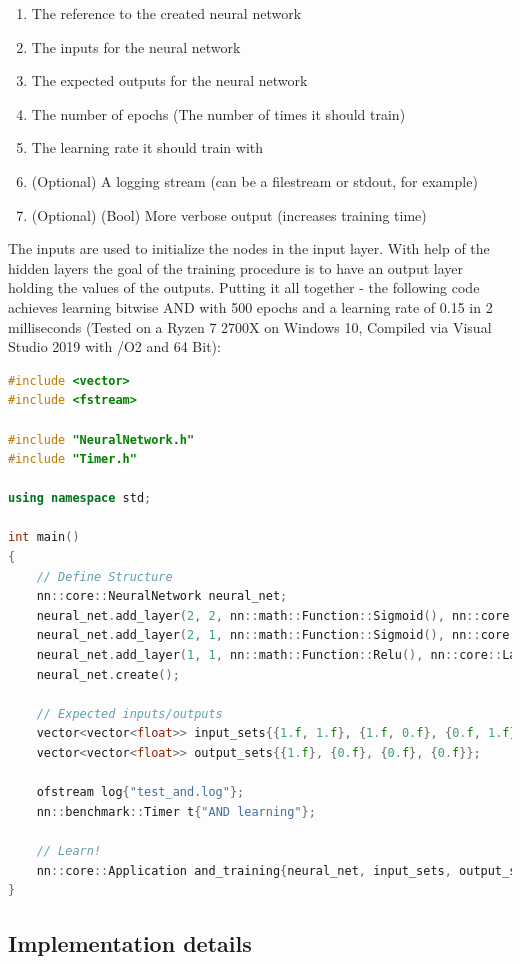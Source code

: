 \begin{enumerate}
	\item The reference to the created neural network
	\item The inputs for the neural network
	\item The expected outputs for the neural network
	\item The number of epochs (The number of times it should train)
	\item The learning rate it should train with
	\item (Optional) A logging stream (can be a filestream or stdout, for example)
	\item (Optional) (Bool) More verbose output (increases training time)
\end{enumerate}

The inputs are used to initialize the nodes in the input layer. With help of the hidden layers the goal of the training procedure is to have an output layer holding the values of the outputs. Putting it all together - the following code achieves learning bitwise AND with 500 epochs and a learning rate of 0.15 in 2 milliseconds (Tested on a Ryzen 7 2700X on Windows 10, Compiled via Visual Studio 2019 with /O2 and 64 Bit):

\newpage

\begin{lstlisting}[language=C++]
#include <vector>
#include <fstream>

#include "NeuralNetwork.h"
#include "Timer.h"

using namespace std;

int main()
{
	// Define Structure
	nn::core::NeuralNetwork neural_net;
	neural_net.add_layer(2, 2, nn::math::Function::Sigmoid(), nn::core::LayerType::Input);
	neural_net.add_layer(2, 1, nn::math::Function::Sigmoid(), nn::core::LayerType::Hidden);
	neural_net.add_layer(1, 1, nn::math::Function::Relu(), nn::core::LayerType::Output);
	neural_net.create();

	// Expected inputs/outputs
	vector<vector<float>> input_sets{{1.f, 1.f}, {1.f, 0.f}, {0.f, 1.f}, {0.f, 0.f}};
	vector<vector<float>> output_sets{{1.f}, {0.f}, {0.f}, {0.f}};

	ofstream log{"test_and.log"};
	nn::benchmark::Timer t{"AND learning"};

	// Learn!
	nn::core::Application and_training{neural_net, input_sets, output_sets, 500, 0.15, log};
}
\end{lstlisting}

\subsection{Implementation details}

